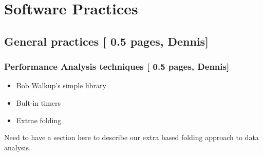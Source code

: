 \section{Software Practices}\label{sec:software}

\subsection{General practices [{\color{red} 0.5 pages, Dennis}]}
 
 \subsubsection{Performance Analysis techniques [{\color{red} 0.5 pages, Dennis]}}
 
 \begin{itemize}
   \item {Bob Walkup's simple library}
   \item {Bult-in timers}
   \item {Extrae folding}
 \end{itemize}
 
 Need to have a section here to describe our extra based folding approach to data analysis.  
 




